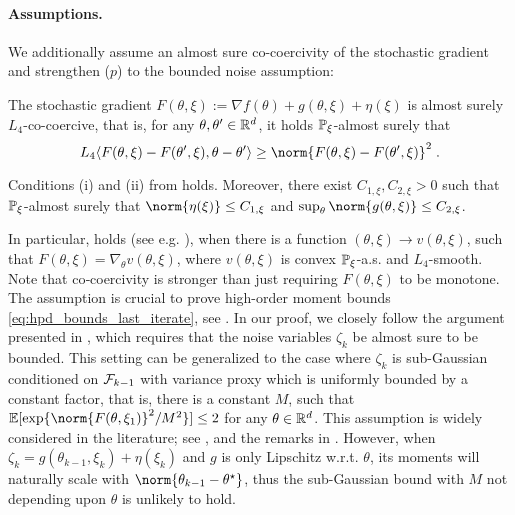 \paragraph{Assumptions.} We additionally assume an almost sure co-coercivity of the stochastic gradient and strengthen ($p$) to the bounded noise assumption:
\begin{assum}
\label{ass:L-co-coercivity-assum}
The stochastic gradient $F(\theta, \xi):= \nabla f(\theta) + g(\theta, \xi) + \eta(\xi)$ is almost surely $L_4$-co-coercive, that is, for any
$\theta, \theta'\in\mathbb{R}^d$, it holds $\mathbb{P}_{\xi}$-almost surely that 
\begin{equation}
\label{eq:L-co-coercivity-assum}
 L_4\langle  F(\theta, \xi) - F(\theta', \xi),\theta-\theta'\rangle \geq \norm{ F(\theta, \xi)- F(\theta', \xi)}^2\eqsp.
\end{equation}
\end{assum}
\begin{assum}
\label{ass:bound_noise}
Conditions (i) and (ii) from  holds. Moreover, there exist $C_{1,\xi}, C_{2,\xi} > 0$ such that $\mathbb{P}_{\xi}$-almost surely that $\norm{ \eta(\xi)} \leq C_{1,\xi}$ and $\sup_{\theta} \norm{g(\theta, \xi)}\leq  C_{2,\xi}$. 
\end{assum}
In particular,  holds (see e.g. \cite{zhu2018coercive}), when there is a function $(\theta,\xi) \to v(\theta,\xi)$, such that $F(\theta, \xi) = \nabla_{\theta} v(\theta,\xi)$, where $v(\theta,\xi)$ is convex $\mathbb{P}_\xi$-a.s. and $L_4$-smooth. Note that co‐coercivity is stronger than just requiring \(F(\theta,\xi)\) to be monotone. The assumption  is crucial to prove high-order moment bounds \eqref{eq:hpd_bounds_last_iterate}, see . In our proof, we closely follow the argument presented in \cite[Theorem 4.1]{harvey2019tight}, which requires that the noise variables $\zeta_k$ be almost sure to be bounded. This setting can be generalized to the case where $\zeta_k$ is sub-Gaussian conditioned on $\mathcal{F}_{k-1}$ with variance proxy which is uniformly bounded by a constant factor, that is, there is a constant $M$, such that $\PE[\exp\{\norm{F(\theta,\xi_1)}^2/M^2\}] \leq 2$ for any $\theta \in \mathbb{R}^{d}$. This assumption is widely considered in the literature; see \cite{nemirovski2009robust,hazan2014beyond}, and the remarks in \cite{harvey2019tight}. However, when $\zeta_k = g(\theta_{k-1},\xi_k) + \eta(\xi_k)$ and $g$ is only Lipschitz w.r.t. $\theta$, its moments will naturally scale with $\norm{\theta_{k-1} - \thetas}$, thus the sub-Gaussian bound with $M$ not depending upon $\theta$ is unlikely to hold.
